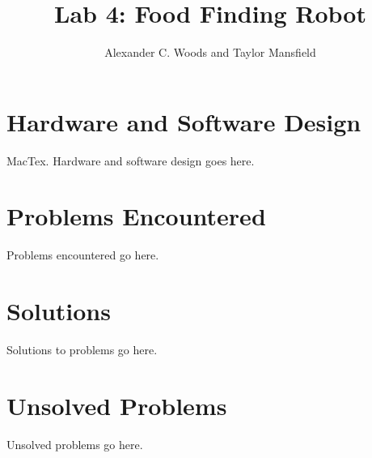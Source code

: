 \documentclass[journal]{IEEEtran}
\begin{document}
\title{\LARGE \bf Lab 4: Food Finding Robot}
\author{Alexander C. Woods and Taylor Mansfield}

\maketitle

\section{Hardware and Software Design}\label{S.design}
 MacTex. Hardware and software design goes here.

\section{Problems Encountered}\label{S.problems}
Problems encountered go here.

\section{Solutions}\label{S.solutions}
Solutions to problems go here.

\section{Unsolved Problems}\label{S.unsolved}
Unsolved problems go here.
\end{document}
